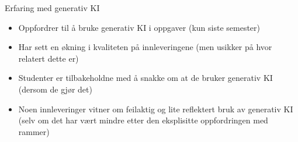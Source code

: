 \documentclass{beamer}
\begin{document}
	\begin{frame}{Erfaring med generativ KI}
		\begin{itemize}
		\item Oppfordrer til å bruke generativ KI i oppgaver (kun siste semester)
		\item Har sett en økning i kvaliteten på innleveringene (men usikker på hvor relatert dette er)
		\item Studenter er tilbakeholdne med å snakke om at de bruker generativ KI (dersom de gjør det)
		\item Noen innleveringer vitner om feilaktig og lite reflektert bruk av generativ KI (selv om det har vært mindre etter den eksplisitte oppfordringen med rammer)
		\end{itemize}
	\end{frame}
\end{document}
